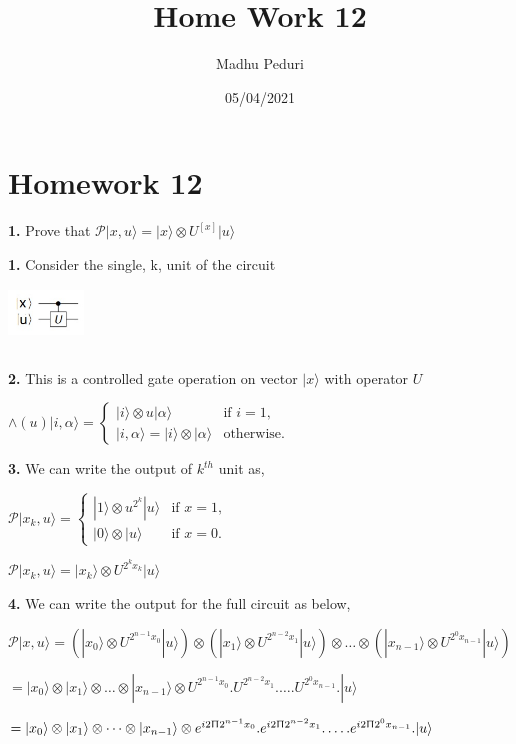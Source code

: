 \documentclass [12pt]{article}
\title{Home Work 12}
\author{Madhu Peduri}
\date{05/04/2021}
\theoremstyle{definition}
\newcommand{\ket}[1]{| {#1} \rangle}
\begin{document}
\section*{Homework 12}

{\bf 1.} Prove that $\mathcal{P}\ket{x,u} = \ket{x} \otimes U^{[x]}\ket{u}$

\phantom{1em} {\bf 1.} Consider the single, k, unit of the circuit\\
\phantom{1000em} \includegraphics[width=2cm, height=2cm]{I1}

\phantom{1em} {\bf 2.} This is a controlled gate operation on vector $\ket{x}$ with operator $U$

\phantom{1000em} $\wedge(u)\ket{i,\alpha} = 
	\begin{cases}
   		\ket{i} \otimes u\ket{\alpha} & \text{if } i = 1, \\
     	\ket{i,\alpha} = \ket{i} \otimes \ket{\alpha} & \text{otherwise}.
    \end{cases}$

\phantom{1em} {\bf 3.} We can write the output of $k^{th}$ unit as,

\phantom{1000em} $\mathcal{P}\ket{x_{k},u} = 
	\begin{cases}
   		\ket{1} \otimes u^{2^{k}}\ket{u} & \text{if } x = 1, \\
     	\ket{0} \otimes \ket{u} & \text{if } x = 0.
    \end{cases}$

\phantom{1000em} $\mathcal{P}\ket{x_{k},u} = \ket{x_{k}} \otimes U^{2^{k}x_{k}}\ket{u}$

\phantom{1em} {\bf 4.} We can write the output for the full circuit as below,

\phantom{1000em} $\mathcal{P}\ket{x,u} = (\ket{x_{0}} \otimes U^{2^{n-1}x_{0}}\ket{u}) \otimes (\ket{x_{1}} \otimes U^{2^{n-2}x_{1}}\ket{u}) \otimes \dots \otimes (\ket{x_{n-1}} \otimes U^{2^{0}x_{n-1}}\ket{u})$

\phantom{1000em} $ = \ket{x_{0}} \otimes \ket{x_{1}} \otimes \dots \otimes \ket{x_{n-1}} \otimes U^{2^{n-1}x_{0}} . U^{2^{n-2}x_{1}} . \dots . U^{2^{0}x_{n-1}} . \ket{u}$

\phantom{1000em} $ = \ket{x_{0}} \otimes \ket{x_{1}} \otimes \dots \otimes \ket{x_{n-1}} \otimes e^{i2\Uppi2^{n-1}x_{0}} . e^{i2\Uppi2^{n-2}x_{1}} . \dots . e^{i2\Uppi2^{0}x_{n-1}} . \ket{u}$
\end{document}
